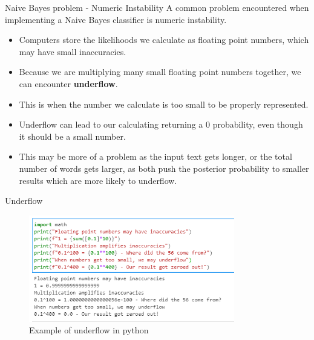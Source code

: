 \documentclass[aspectratio=169, 10pt]{beamer}
\begin{document}
\begin{frame}{Naive Bayes problem - Numeric Instability}
    A common problem encountered when implementing a Naive Bayes classifier is numeric instability.
    \begin{itemize}
        \item Computers store the likelihoods we calculate as floating point numbers, which may have small inaccuracies.
        \item Because we are multiplying many small floating point numbers together, we can encounter \textbf{underflow}.
        \item This is when the number we calculate is too small to be properly represented.
        \item Underflow can lead to our calculating returning a 0 probability, even though it should be a small number.
        \item This may be more of a problem as the input text gets longer, or the total number of words gets larger, as both push the posterior probability to smaller results which are more likely to underflow.
    \end{itemize}
\end{frame}

\begin{frame}{Underflow}
\begin{figure}
    \centering
    \includegraphics[width=0.8\textwidth]{../imgs/underflow.png}
    \caption{Example of underflow in python}
\end{figure}
\end{frame}
    
\end{document}
